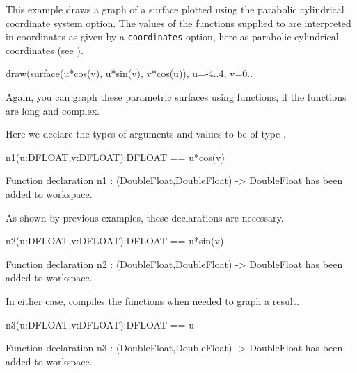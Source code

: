%
\begin{psXtc}
\begin{xtccomment}
This example draws a graph of a surface plotted using the
parabolic cylindrical coordinate system option.
The values of the functions supplied to  are
interpreted in coordinates as given by a {\tt coordinates} option,
here as parabolic cylindrical coordinates (see
).
\end{xtccomment}
\begin{spadsrc}
draw(surface(u*cos(v), u*sin(v), v*cos(u)), u=-4..4, v=0..%
\end{spadsrc}
\end{psXtc}
%
Again, you can graph these parametric surfaces using functions,
if the functions are long and complex.
\begin{xtc}
\begin{xtccomment}
Here we declare the types of arguments and values to be of type
.
\end{xtccomment}
\begin{spadsrc}
n1(u:DFLOAT,v:DFLOAT):DFLOAT == u*cos(v) 
\end{spadsrc}
\begin{MessageOutput}
   Function declaration n1 : (DoubleFloat,DoubleFloat) -> DoubleFloat 
      has been added to workspace.
\end{MessageOutput}
\end{xtc}
\begin{xtc}
\begin{xtccomment}
As shown by previous examples, these declarations are necessary.
\end{xtccomment}
\begin{spadsrc}
n2(u:DFLOAT,v:DFLOAT):DFLOAT == u*sin(v) 
\end{spadsrc}
\begin{MessageOutput}
   Function declaration n2 : (DoubleFloat,DoubleFloat) -> DoubleFloat 
      has been added to workspace.
\end{MessageOutput}
\end{xtc}
\begin{xtc}
\begin{xtccomment}
In either case, \Language{} compiles the functions
when needed to graph a result.
\end{xtccomment}
\begin{spadsrc}
n3(u:DFLOAT,v:DFLOAT):DFLOAT == u 
\end{spadsrc}
\begin{MessageOutput}
   Function declaration n3 : (DoubleFloat,DoubleFloat) -> DoubleFloat 
      has been added to workspace.
\end{MessageOutput}
\end{xtc}
